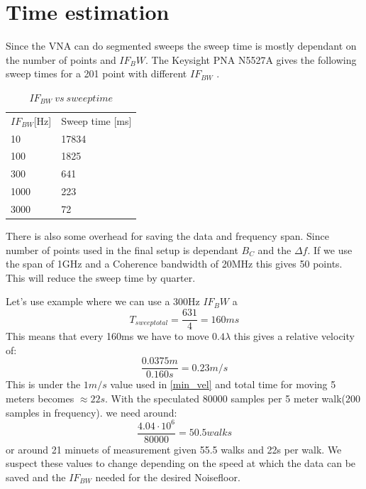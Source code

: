 \section{Time estimation}
Since the \gls{VNA} can do segmented sweeps the sweep time is mostly dependant on the number of points and $IF_BW$.
The Keysight PNA N5527A gives the following sweep times for a 201 point with different $IF_{BW}$ \citep{Key_PNA}. \\

\begin{table}[H]
\centering
\caption{$IF_{BW} \ vs \ sweep time$}
\label{my-label}
\begin{tabular}{l|l}
\hline
$IF_{BW}${[}Hz{]} & Sweep time {[}ms{]} \\
10              & 17834               \\
100             & 1825                \\
300             & 641                 \\
1000            & 223                 \\
3000            & 72                 
\end{tabular}
\end{table}

There is also some overhead for saving the data and frequency span. Since number of points used in the final setup is dependant $B_C$ and the $\Delta f$. If we use the span of 1GHz and a Coherence bandwidth of 20MHz this gives 50 points. This will reduce the sweep time by quarter.

Let's use example where we can use a 300Hz $IF_BW$ a
\begin{equation}
T_{sweep total} = \frac{631}{4} = 160ms
\end{equation}
This means that every 160ms we have to move $0.4 \lambda$ this gives a relative velocity of:
\begin{equation}
\frac{0.0375m}{0.160s} = 0.23 m/s
\end{equation}
This is under the $1m/s$ value used in \autoref{min_vel}
and total time for moving 5 meters becomes $\approx 22s$.
With the speculated 80000 samples per 5 meter walk(200 samples in frequency). we need around:
\begin{equation}
\frac{4.04 \cdot 10^6}{80000} = 50.5 walks
\end{equation}
or around 21 minuets of measurement given 55.5 walks and 22s per walk. We suspect these values to change depending on the speed at which the data can be saved and the $IF_{BW}$ needed for the desired Noisefloor.

